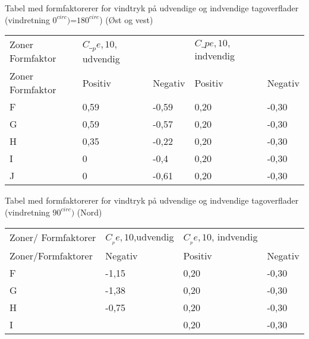 Tabel med formfaktorerer for vindtryk på udvendige og indvendige tagoverflader (vindretning $0^{circ})$=$180^{circ}$) (Øst og vest)

\begin{table}[h]
\begin{tabular}{lllll}
Zoner Formfaktor & $C\__pe,10$, udvendig &         & $C\_pe,10,$indvendig &         \\
Zoner Formfaktor & Positiv             & Negativ & Positiv             & Negativ \\
F                & 0,59                & -0,59   & 0,20                 & -0,30    \\
G                & 0,59                & -0,57   & 0,20                 & -0,30    \\
H                & 0,35                & -0,22   & 0,20                 & -0,30    \\
I                & 0                   & -0,4    & 0,20                 & -0,30    \\
J                & 0                   & -0,61   & 0,20                 & -0,30   
\end{tabular}
\end{table}


Tabel med formfaktorerer for vindtryk på udvendige og indvendige tagoverflader (vindretning $90^{circ})$ (Nord)

\begin{table}[h]
	\begin{tabular}{llll}
		Zoner/ Formfaktorer & $C__pe,10$,udvendig & $C__pe,10$, indvendig &         \\
		Zoner/Formfaktorer  & Negativ             & Positiv               & Negativ \\
		F                   & -1,15               & 0,20                  & -0,30   \\
		G                   & -1,38               & 0,20                  & -0,30   \\
		H                   & -0,75               & 0,20                  & -0,30   \\
		I                   &                     & 0,20                  & -0,30  
	\end{tabular}
\end{table}



